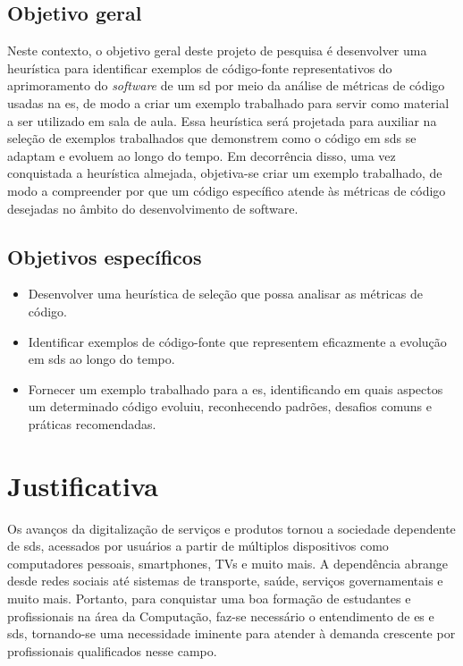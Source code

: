 \subsection{Objetivo geral}\label{subsec:objetivoGeral}
Neste contexto, o objetivo geral deste projeto de pesquisa é desenvolver uma heurística para identificar exemplos de código-fonte representativos do aprimoramento do \textit{software} de um \gls{sd} por meio da análise de métricas de código usadas na \gls{es}, de modo a criar um exemplo trabalhado para servir como material a ser utilizado em sala de aula. Essa heurística será projetada para auxiliar na seleção de exemplos trabalhados que demonstrem como o código em \gls{sds} se adaptam e evoluem ao longo do tempo. Em decorrência disso, uma vez conquistada a heurística almejada, objetiva-se criar um exemplo trabalhado, de modo a compreender por que um código específico atende às métricas de código desejadas no âmbito do desenvolvimento de software.

\subsection{Objetivos específicos}\label{subsec:objetivosEspecificos}
\begin{itemize}
    \item Desenvolver uma heurística de seleção que possa analisar as métricas de código.
    \item Identificar exemplos de código-fonte que representem eficazmente a evolução em \gls{sds} ao longo do tempo.
    \item Fornecer um exemplo trabalhado para a \gls{es}, identificando em quais aspectos um determinado código evoluiu, reconhecendo padrões, desafios comuns e práticas recomendadas.
\end{itemize}

\section{Justificativa}\label{sec:justificativa}
Os avanços da digitalização de serviços e produtos tornou a sociedade dependente de \gls{sds}, acessados por usuários a partir de múltiplos dispositivos como computadores pessoais, smartphones, TVs e muito mais. A dependência abrange desde redes sociais até sistemas de transporte, saúde, serviços governamentais e muito mais. Portanto, para conquistar uma boa formação de estudantes e profissionais na área da Computação, faz-se necessário o entendimento de \gls{es} e \gls{sds}, tornando-se uma necessidade iminente para atender à demanda crescente por profissionais qualificados nesse campo. 

